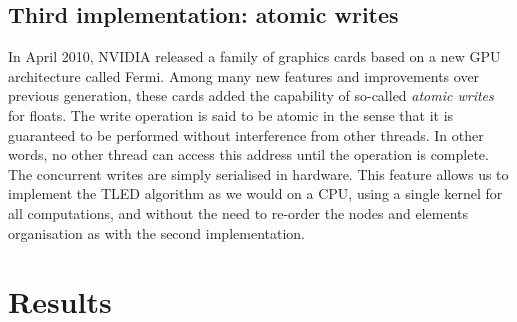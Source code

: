 	\subsection{Third implementation: atomic writes}
In April 2010, NVIDIA released a family of graphics cards based on a new GPU architecture called Fermi. Among many new features and improvements over previous generation, these cards added the capability of so-called \emph{atomic writes} for floats. The write operation is said to be atomic in the sense that it is guaranteed to be performed without interference from other threads. In other words, no other thread can access this address until the operation is complete. The concurrent writes are simply serialised in hardware. This feature allows us to implement the TLED algorithm as we would on a CPU, using a single kernel for all computations, and without the need to re-order the nodes and elements organisation as with the second implementation. 


	
\section{Results}	

